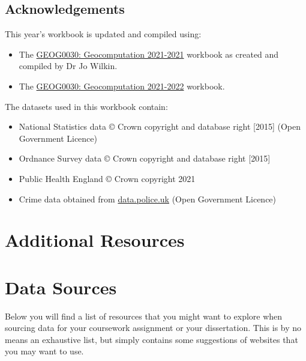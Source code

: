 \documentclass[
]{book}
\providecommand{\tightlist}{%
  \setlength{\itemsep}{0pt}\setlength{\parskip}{0pt}}
\begin{document}
\hypertarget{acknowledgements}{%
\section*{Acknowledgements}\label{acknowledgements}}

This year's workbook is updated and compiled using:

\begin{itemize}
\tightlist
\item
  The \href{https://jo-wilkin.github.io/GEOG0030/coursebook/index.html}{GEOG0030: Geocomputation 2021-2021} workbook as created and compiled by Dr Jo Wilkin.
\item
  The \href{https://jtvandijk.github.io/GEOG0030_20212022/}{GEOG0030: Geocomputation 2021-2022} workbook.
\end{itemize}

The datasets used in this workbook contain:

\begin{itemize}
\tightlist
\item
  National Statistics data © Crown copyright and database right {[}2015{]} (Open Government Licence)
\item
  Ordnance Survey data © Crown copyright and database right {[}2015{]}
\item
  Public Health England © Crown copyright 2021
\item
  Crime data obtained from \href{https://data.police.uk/}{data.police.uk} (Open Government Licence)
\end{itemize}

\hypertarget{additional-resources}{%
\chapter*{Additional Resources}\label{additional-resources}}

\hypertarget{data-sources}{%
\chapter{Data Sources}\label{data-sources}}

Below you will find a list of resources that you might want to explore when sourcing data for your coursework assignment or your dissertation. This is by no means an exhaustive list, but simply contains some suggestions of websites that you may want to use.
\end{document}
